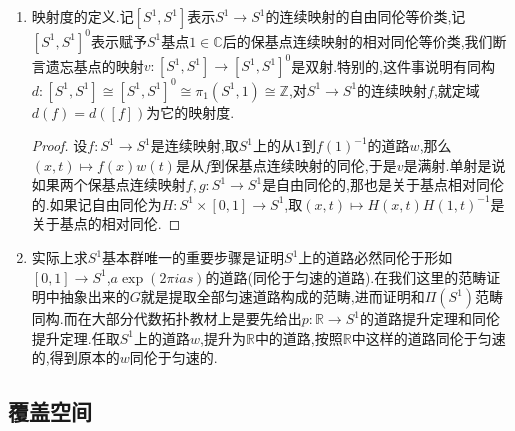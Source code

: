 \begin{enumerate}
\begin{proof}
		按照群胚上的Van Kampen定理,有$\Pi(S^1)$是pushout,于是存在函子$\gamma:\Pi(S^1)\to G$,并且泛性质说明$\xi\circ\gamma=\mathrm{id}_{\Pi(S^1)}$.我们只需验证$\gamma\circ\xi=\mathrm{id}_G$.考虑如下交换图表,这归结为证明$G$中的态射都可以表示为$\gamma_U$和$\gamma_V$像的复合.任取$G$中的从$a$到$b$的态射$(a,t)$,记$t=t_1+t_2+\cdots+t_m$,使得每个$|t_i|<1/2$.记$a_0=a$,$a_j=a\exp(2\pi j(t_1+t_2+\cdots+t_j))$,那么有$(a,t)=(a_{m-1},t_m)\circ\cdots\circ(a_1,t_2)\circ(a,t_1)$.这里每个$(a_{j-1},t_j)$作为道路的像肯定落在$U,V$中的某个,不妨设为$U$,那么有$(a_{j-1},t_j)=\gamma_U(a_{j-1},a_j)_U$.得证.
		$$\xymatrix{\Pi(U)\ar[dr]^{r_U}\ar@/^1pc/[drr]^{\Pi(j_U)}\ar@/^2pc/[drrrr]^{r_U}&&&&\\&G\ar[r]^{\xi}&\Pi(S^1)\ar[rr]^{\gamma}&&G\\\Pi(V)\ar[ur]_{r_U}\ar@/_1pc/[urr]_{\Pi(j_U)}\ar@/_2pc/[urrrr]_{r_U}&&&&}$$
	\end{proof}
    \item 映射度的定义.记$[S^1,S^1]$表示$S^1\to S^1$的连续映射的自由同伦等价类,记$[S^1,S^1]^0$表示赋予$S^1$基点$1\in\mathbb{C}$后的保基点连续映射的相对同伦等价类,我们断言遗忘基点的映射$v:[S^1,S^1]\to[S^1,S^1]^0$是双射.特别的,这件事说明有同构$d:[S^1,S^1]\cong[S^1,S^1]^0\cong\pi_1(S^1,1)\cong\mathbb{Z}$,对$S^1\to S^1$的连续映射$f$,就定域$d(f)=d([f])$为它的映射度.
    \begin{proof}
    	
    	设$f:S^1\to S^1$是连续映射,取$S^1$上的从$1$到$f(1)^{-1}$的道路$w$,那么$(x,t)\mapsto f(x)w(t)$是从$f$到保基点连续映射的同伦,于是$v$是满射.单射是说如果两个保基点连续映射$f,g:S^1\to S^1$是自由同伦的,那也是关于基点相对同伦的.如果记自由同伦为$H:S^1\times[0,1]\to S^1$,取$(x,t)\mapsto H(x,t)H(1,t)^{-1}$是关于基点的相对同伦.
    \end{proof}
    \item 实际上求$S^1$基本群唯一的重要步骤是证明$S^1$上的道路必然同伦于形如$[0,1]\to S^1$,$a\exp(2\pi ias)$的道路(同伦于匀速的道路).在我们这里的范畴证明中抽象出来的$G$就是提取全部匀速道路构成的范畴,进而证明和$\Pi(S^1)$范畴同构.而在大部分代数拓扑教材上是要先给出$p:\mathbb{R}\to S^1$的道路提升定理和同伦提升定理.任取$S^1$上的道路$w$,提升为$\mathbb{R}$中的道路,按照$\mathbb{R}$中这样的道路同伦于匀速的,得到原本的$w$同伦于匀速的.
\end{enumerate}
\newpage
\subsection{覆盖空间}

